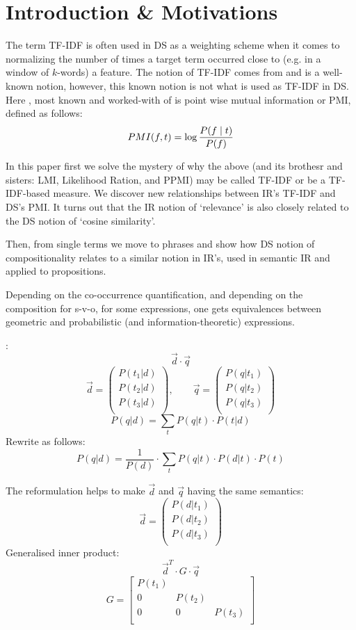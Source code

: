 \section{Introduction \& Motivations}


The term TF-IDF is often used in DS as a weighting scheme when it comes to normalizing  the number of times a target term occurred close to (e.g. in a window of $k$-words) a feature. The notion of TF-IDF comes from and is a well-known notion, however, this known notion is not what is used as TF-IDF in DS. Here ,  most known and worked-with of  is point wise mutual information or  PMI, defined as follows:
\[
 PMI (f, t) =  \log{{P(f \mid t)} \over{P(f)}}
 \]


In this paper first we solve the mystery of why  the above (and its brothesr and sisters: LMI, Likelihood Ration, and PPMI) may be called TF-IDF or be a TF-IDF-based measure. We discover new relationships between IR's TF-IDF and DS's PMI. It turns out that the IR notion of `relevance'  is also closely related to the DS notion of `cosine similarity'. 

Then, from single terms we move to phrases and show how DS notion of  compositionality relates to a similar notion in  IR's, used in semantic IR and applied to propositions. 


\hrulefill

Depending on the co-occurrence quantification, and depending on the composition for s-v-o, for some expressions, one  gets equivalences between geometric and probabilistic (and information-theoretic) expressions.


\cite{Wong/Yao:95}:
\[
\vec{d} \cdot \vec{q}
\]
\[
\vec{d} =
	\left(
	\begin{matrix}
	P(t_1|d)\\
	P(t_2|d)\\
	P(t_3|d)\\
	\end{matrix}
	\right),
\qquad
\vec{q} =
	\left(
	\begin{matrix}
	P(q|t_1)\\
	P(q|t_2)\\
	P(q|t_3)\\
	\end{matrix}
	\right)
\]
\[
P(q|d) = \sum_t P(q|t) \cdot P(t|d)
\]
Rewrite as follows:
\[
P(q|d) = \frac{1}{P(d)} \cdot \sum_t P(q|t) \cdot P(d|t) \cdot P(t)
\]

The reformulation helps
to make $\vec{d}$ and $\vec{q}$ having the same semantics:
\[
\vec{d} =
	\left(
	\begin{matrix}
	P(d|t_1)\\
	P(d|t_2)\\
	P(d|t_3)\\
	\end{matrix}
	\right)
\]
Generalised inner product:
\[
\vec{d}^T \cdot G \cdot \vec{q}
\]
\[
G=
\left[
\begin{matrix}
P(t_1) \\
0 & P(t_2) \\
0 & 0 & P(t_3) \\
\end{matrix}
\right]
\]


